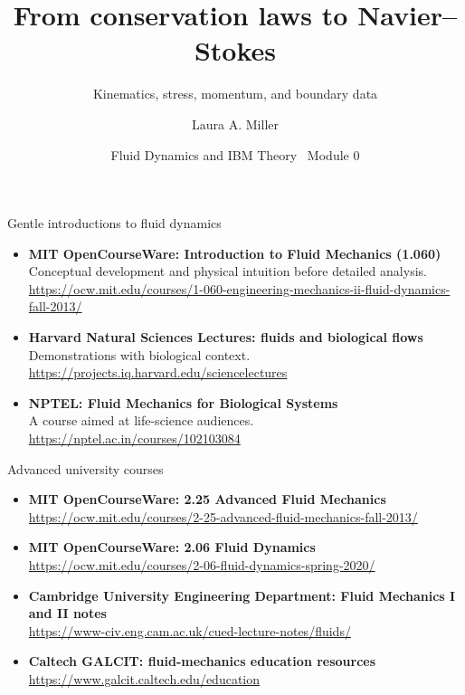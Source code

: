 \documentclass[aspectratio=169,11pt]{beamer}
\title[Navier--Stokes]{From conservation laws to Navier--Stokes}
\subtitle{Kinematics, stress, momentum, and boundary data}
\author[Miller]{Laura A. Miller}
\institute[UArizona]{Department of Mathematics, University of Arizona}
\date{Fluid Dynamics and IBM Theory \textbullet\ Module 0}
\newcommand{\uvec}{\bm{u}}
\newcommand{\bvec}{\bm{b}}
\begin{document}
\begin{frame}[plain]
\renewcommand{\includegraphics}[2][]{%
  \begin{punchbox}
  \centering
  \[
    \begin{aligned}
    &\rho\left(
    \frac{\partial\uvec}{\partial t}
    +(\uvec\!\cdot\!\nabla)\uvec
    \right)\\
    &\qquad=-\nabla p+\mu\nabla^2\uvec+\rho\bvec
    \end{aligned}
  \]
  \[
    \nabla\!\cdot\uvec=0
  \]
  \end{punchbox}}
\end{frame}

\begin{frame}{Gentle introductions to fluid dynamics}
\small
\begin{itemize}\itemsep7pt
  \item \textbf{MIT OpenCourseWare: Introduction to Fluid Mechanics (1.060)}\\
  Conceptual development and physical intuition before detailed analysis.\\
  \url{https://ocw.mit.edu/courses/1-060-engineering-mechanics-ii-fluid-dynamics-fall-2013/}
  \item \textbf{Harvard Natural Sciences Lectures: fluids and biological flows}\\
  Demonstrations with biological context.\\
  \url{https://projects.iq.harvard.edu/sciencelectures}
  \item \textbf{NPTEL: Fluid Mechanics for Biological Systems}\\
  A course aimed at life-science audiences.\\
  \url{https://nptel.ac.in/courses/102103084}
\end{itemize}
\end{frame}

\begin{frame}{Advanced university courses}
\small
\begin{itemize}\itemsep6pt
  \item \textbf{MIT OpenCourseWare: 2.25 Advanced Fluid Mechanics}\\
  \url{https://ocw.mit.edu/courses/2-25-advanced-fluid-mechanics-fall-2013/}
  \item \textbf{MIT OpenCourseWare: 2.06 Fluid Dynamics}\\
  \url{https://ocw.mit.edu/courses/2-06-fluid-dynamics-spring-2020/}
  \item \textbf{Cambridge University Engineering Department: Fluid Mechanics I and II notes}\\
  \url{https://www-civ.eng.cam.ac.uk/cued-lecture-notes/fluids/}
  \item \textbf{Caltech GALCIT: fluid-mechanics education resources}\\
  \url{https://www.galcit.caltech.edu/education}
\end{itemize}
\end{frame}
\end{document}
